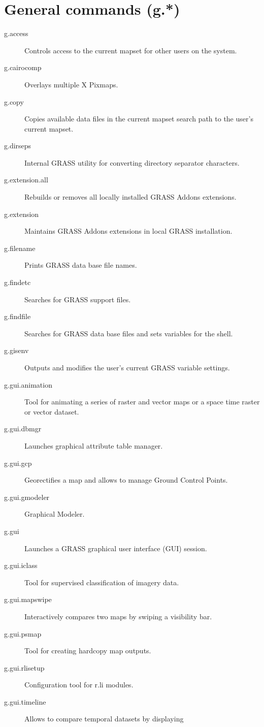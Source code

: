 
\section{General commands (g.{*})}
\begin{description}
\item [{g.access}] Controls access to the current mapset for other users
on the system.
\item [{g.cairocomp}] Overlays multiple X Pixmaps.
\item [{g.copy}] Copies available data files in the current mapset search
path to the user's current mapset.
\item [{g.dirseps}] Internal GRASS utility for converting directory separator
characters.
\item [{g.extension.all}] Rebuilds or removes all locally installed GRASS
Addons extensions.
\item [{g.extension}] Maintains GRASS Addons extensions in local GRASS
installation.
\item [{g.filename}] Prints GRASS data base file names.
\item [{g.findetc}] Searches for GRASS support files.
\item [{g.findfile}] Searches for GRASS data base files and sets variables
for the shell.
\item [{g.gisenv}] Outputs and modifies the user's current GRASS variable
settings.
\item [{g.gui.animation}] Tool for animating a series of raster and vector
maps or a space time raster or vector dataset.
\item [{g.gui.dbmgr}] Launches graphical attribute table manager.
\item [{g.gui.gcp}] Georectifies a map and allows to manage Ground Control
Points.
\item [{g.gui.gmodeler}] Graphical Modeler.
\item [{g.gui}] Launches a GRASS graphical user interface (GUI) session.
\item [{g.gui.iclass}] Tool for supervised classification of imagery data.
\item [{g.gui.mapswipe}] Interactively compares two maps by swiping a visibility
bar.
\item [{g.gui.psmap}] Tool for creating hardcopy map outputs.
\item [{g.gui.rlisetup}] Configuration tool for r.li modules.
\item [{g.gui.timeline}] Allows to compare temporal datasets by displaying

\end{description}
